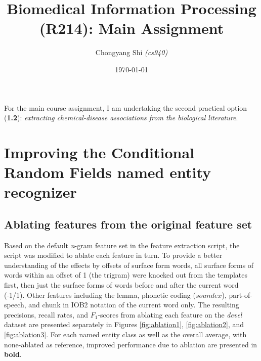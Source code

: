 \documentclass[10pt, oneside]{article}
\title{\vspace{-1cm}Biomedical Information Processing (R214): Main Assignment}
\author{Chongyang Shi \emph{(cs940)}}
\date{\today}
\begin{document}
\maketitle

For the main course assignment, I am undertaking the second practical option (\textbf{1.2}): \emph{extracting chemical-disease associations from the biological literature}.

\section{Improving the Conditional Random Fields named entity recognizer}
\subsection{Ablating features from the original feature set} \label{subsec:ablating}

Based on the default \emph{n}-gram feature set in the feature extraction script, the script was modified to ablate each feature in turn. To provide a better understanding of the effects by offsets of surface form words, all surface forms of words within an offset of 1 (the trigram) were knocked out from the templates first, then just the surface forms of words before and after the current word (-1/1). Other features including the lemma, phonetic coding ($soundex$), part-of-speech, and chunk in IOB2 notation of the current word only. The resulting precisions, recall rates, and $F_1$-scores from ablating each feature on the \emph{devel} dataset are presented separately in Figures \ref{fig:ablation1}, \ref{fig:ablation2}, and \ref{fig:ablation3}. For each named entity class as well as the overall average, with none-ablated as reference, improved performance due to ablation are presented in \textbf{bold}.
\end{document}
